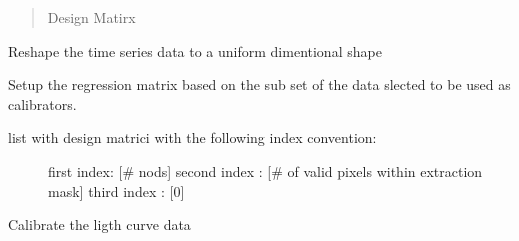 \documentclass[a4paper,11pt,english]{sphinxmanual}
\begin{document}
\begin{fulllineitems}
\begin{fulllineitems}
\begin{quote}
Design Matirx
\end{quote}

\end{fulllineitems}


\begin{fulllineitems}
\label{\detokenize{cascade.TSO:cascade.TSO.TSO.TSOSuite.reshape_data}}
Reshape the time series data to a uniform dimentional shape

\end{fulllineitems}


\begin{fulllineitems}
\label{\detokenize{cascade.TSO:cascade.TSO.TSO.TSOSuite.return_all_design_matrices}}
Setup the regression matrix based on the sub set of the data slected
to be used as calibrators.
\begin{description}
\item[{list with design matrici with the following index convention:}] \leavevmode
first index: {[}\# nods{]}
second index : {[}\# of valid pixels within extraction mask{]}
third index : {[}0{]}

\end{description}

\end{fulllineitems}


\begin{fulllineitems}
\label{\detokenize{cascade.TSO:cascade.TSO.TSO.TSOSuite.calibrate_timeseries}}
Calibrate the ligth curve data

\end{fulllineitems}



\end{fulllineitems}
\end{document}

